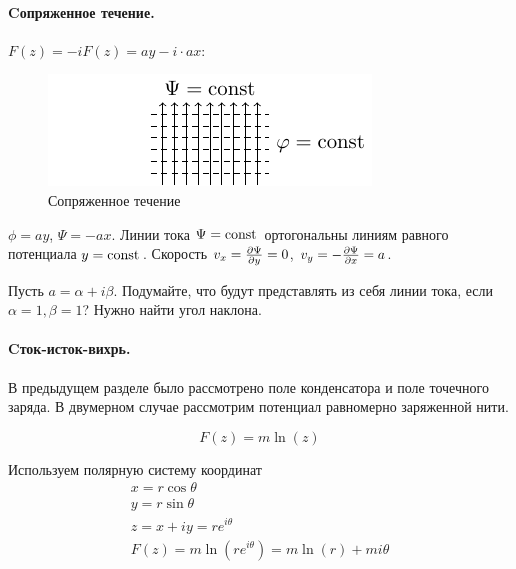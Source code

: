 \paragraph{Cопряженное течение.} $F(z)=-iF(z)=ay - i\cdot ax$:

\begin{figure}[h!]
    \centering
    \includegraphics[scale=1.5]{img/sopr_potent}
    \caption{Сопряженное течение}
    \label{fig:figure1}
\end{figure}
$\phi=ay$, $\Psi=-ax$. Линии тока $\Psi=\mathrm{const}\,$ ортогональны линиям равного потенциала $y=\mathrm{const}\,$. Скорость $v_x=\pdv{\Psi}{y}=0$, $v_y=-\pdv{\Psi}{x}=a$.

Пусть $a=\alpha + i\beta$. Подумайте, что будут представлять из себя линии тока, если $\alpha=1,\beta=1$? Нужно найти угол наклона.

\paragraph{Cток-исток-вихрь.} В предыдущем разделе было рассмотрено поле конденсатора и поле точечного заряда. В двумерном случае рассмотрим потенциал равномерно заряженной нити.

\begin{equation}
	F(z)=m\ln(z)
\end{equation}

Используем полярную систему координат
\begin{gather}
	\label{eqss}
	x=r\cos\theta\\
	y=r\sin\theta\\
	z=x+iy=re^{i\theta}\\
	F(z)=m\ln(re^{i\theta})=m\ln(r)+mi\theta
\end{gather}

